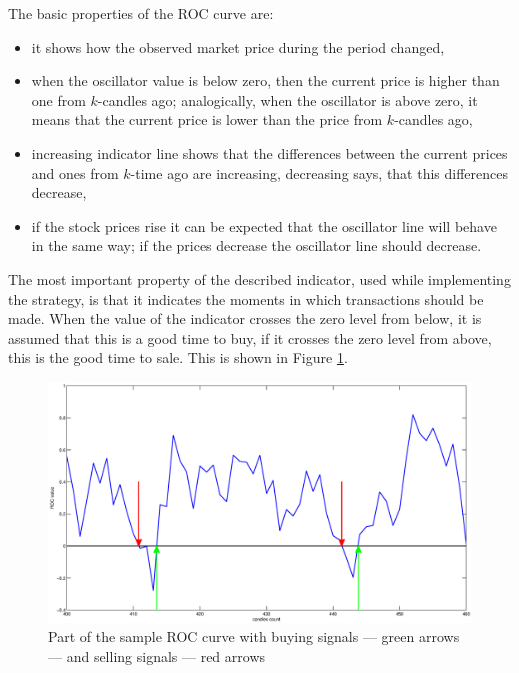 \noindent The basic properties of the ROC curve are:
\begin{itemize}
\item it shows how the observed market price during the period changed,
\item when the oscillator value is below zero, then the current price is higher than one from $k$-candles ago; analogically, when the oscillator is above zero, it means that the current price is lower than the price from $k$-candles ago,
\item increasing indicator line shows that the differences between the current prices and ones from $k$-time ago are increasing, decreasing says, that this differences decrease,
\item if the stock prices rise it can be expected that the oscillator line will behave in the same way; if the prices decrease the oscillator line should decrease.
\end{itemize}
The most important property of the described indicator, used while implementing  the strategy, is that it indicates the moments in which transactions should be made. When the value of the indicator crosses the zero level from below, it is assumed that this is a good time to buy, if it crosses the zero level from above, this is the good time to sale. This is shown in Figure \ref{kupsprzroc}.\\
\begin{figure}[h!]
\centering
\includegraphics[width = \textwidth]{BuySell.eps}
\caption{Part of the sample ROC curve with buying signals --- green arrows --- and selling signals --- red arrows}
\label{kupsprzroc}
\end{figure}
\FloatBarrier

